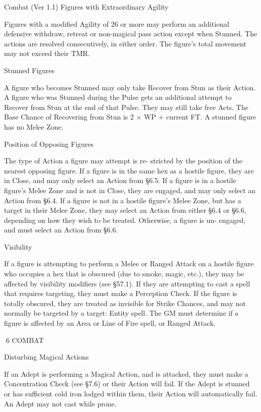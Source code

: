 \begin{Chapter}{Combat (Ver 1.1)}
Figures with Extraordinary Agility 

Figures with a modified Agility of 26 or more may 
perform  an  additional  defensive  withdraw,  retreat 
or  non-magical  pass  action  except  when  Stunned. 
The  actions  are  resolved  consecutively,  in  either 
order. The figure’s total movement may not exceed 
their TMR. 

Stunned Figures 

A  figure  who  becomes  Stunned  may  only  take 
Recover  from  Stun  as  their  Action.  A  figure  who 
was  Stunned  during  the  Pulse  gets  an  additional 
attempt  to  Recover  from  Stun  at  the  end  of  that 
Pulse.  They  may  still  take  free  Acts.  The  Base 
Chance  of  Recovering  from  Stun  is  2  ×  WP  + 
current FT. A stunned figure has no Melee Zone. 

Position of Opposing Figures 

The  type  of  Action  a  figure  may  attempt  is  re-
stricted  by  the  position  of  the  nearest  opposing 
figure.  If  a  figure  is  in  the  same  hex  as  a  hostile 
figure,  they  are  in  Close,  and  may  only  select  an 
Action from §6.5. If a figure is in a hostile figure’s 
Melee Zone and is not in Close, they are engaged, 
and  may  only  select  an  Action  from  §6.4.  If  a 
figure  is  not  in  a  hostile  figure’s  Melee  Zone,  but 
has a target in their Melee Zone, they may select an 
Action from either §6.4 or §6.6, depending on how 
they  wish  to  be  treated.  Otherwise,  a  figure  is  un-
engaged, and must select an Action from §6.6. 

Visibility 

If  a  figure  is  attempting  to  perform  a  Melee  or 
Ranged  Attack  on  a  hostile  figure  who  occupies  a 
hex  that  is  obscured  (due  to  smoke,  magic,  etc.), 
they  may  be  affected  by  visibility  modifiers  (see 
§57.1).  If  they  are  attempting  to  cast  a  spell  that 
requires  targeting,  they  must  make  a  Perception 
Check.  If  the  figure  is  totally  obscured,  they  are 
treated as invisible for Strike Chances, and may not 
normally  be  targeted  by  a  target:  Entity  spell.  The 
GM  must  determine  if  a  figure  is  affected  by  an 
Area or Line of Fire spell, or Ranged Attack. 

6 COMBAT 

Disturbing Magical Actions 

If an Adept is performing a Magical Action, and is 
attacked,  they  must  make  a  Concentration  Check 
(see  §7.6)  or  their  Action  will  fail.  If  the  Adept  is 
stunned  or  has  sufficient  cold  iron  lodged  within 
them,  their  Action  will  automatically  fail.  An 
Adept may not cast while prone. 


\end{Chapter}
